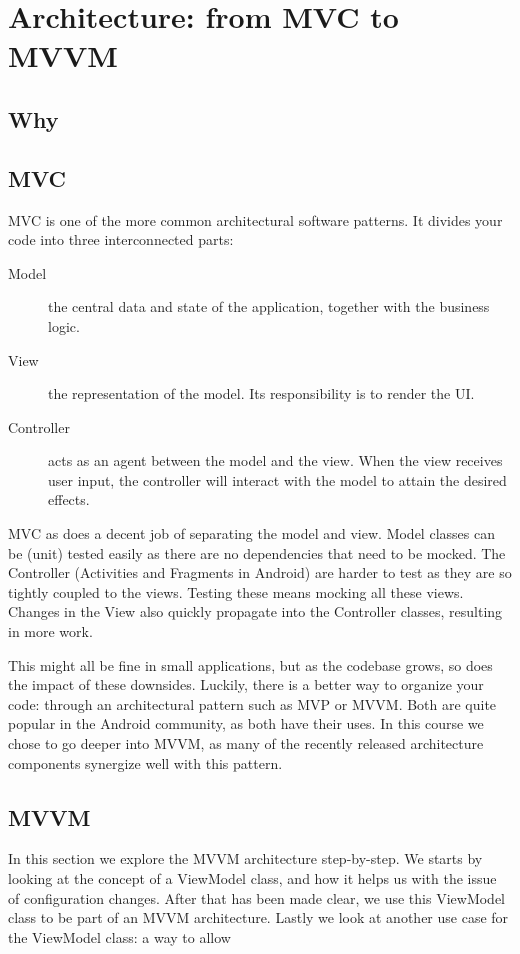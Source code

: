 
\chapter{Architecture: from MVC to MVVM}

\section{Why}

\section{MVC}
MVC is one of the more common architectural software patterns.
It divides your code into three interconnected parts\cite{mvc-mvp-mvv-on-android}: 
\begin{description}
	\item[Model] the central data and state of the application, together with the business logic.
	\item[View] the representation of the model. Its responsibility is to render the UI.
	\item[Controller] acts as an agent between the model and the view. 
		When the view receives user input, the controller will interact with the model to attain the desired effects.
\end{description}

MVC as does a decent job of separating the model and view.
Model classes can be (unit) tested easily as there are no dependencies that need to be mocked.
The Controller (Activities and Fragments in Android) are harder to test as they are so tightly coupled to the views.
Testing these means mocking all these views. 
Changes in the View also quickly propagate into the Controller classes, resulting in more work.

This might all be fine in small applications, but as the codebase grows, so does the impact of these downsides.
Luckily, there is a better way to organize your code: through an architectural pattern such as MVP or MVVM.
Both are quite popular in the Android community, as both have their uses.
In this course we chose to go deeper into MVVM, as many of the recently released architecture components  synergize well with this pattern.

\section{MVVM}
In this section we explore the MVVM architecture step-by-step. 
We starts by looking at the concept of a ViewModel class, and how it helps us with the issue of configuration changes.
After that has been made clear, we use this ViewModel class to be part of an MVVM architecture. 
Lastly we look at another use case for the ViewModel class: a way to allow 

